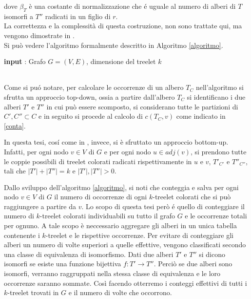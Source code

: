 dove $ \beta_T $ \`e una costante di normalizzazione che \'e uguale al numero di alberi di $ T $ isomorfi a $ T'' $ radicati in un figlio di $ r $.\\
 La correttezza e la complessit\`a di questa costruzione, non sono trattate qui, ma vengono dimostrate in \cite{alon1995color}.\\
 Si pu\`o vedere l'algoritmo formalmente  descritto in Algoritmo \ref{algoritmo}.\mbox{}\\


\begin{algorithm}[H]
	\label{algoritmo}
	\SetAlgoLined
	\caption{Fase di costruzione}
 	\textbf{input} : Grafo $ G =(V,E) $, dimensione del treelet $ k $ \;	
 			
\end{algorithm}\mbox{}\\

Come si pu\'o notare, per calcolare le occorrenze di un albero $ T_C $ nell'algoritmo si sfrutta un approccio top-down, ossia a partire dall'albero $ T_C $ si identificano i due alberi $ T' $ e $ T'' $ in cui pu\`o essere scomposto, si considerano tutte le partizioni di $ C',C'' \subset C $ e in seguito si procede al calcolo di $ c(T_C,v) $ come indicato in \eqref{conta}.

In questa tesi, cos\'i come in \cite{bressan2019motivo}, invece, si \`e sfruttato un approccio bottom-up. Infatti, per ogni nodo $ v \in V $ di $ G $ e per ogni nodo $ u \in adj(v)$, si prendono tutte le coppie possibili di treelet colorati radicati rispettivamente in $ u $ e $ v $, $ T'_{C'} $ e $ T''_{C''} $, tali che $ |T'| + |T''| = k $ e $ |T'|,|T''|>0 $.

Dallo sviluppo dell'algoritmo \ref{algoritmo}, si noti che conteggia e salva per ogni nodo $ v\in V $ di $ G $ il numero di occorrenze di ogni $ k $-treelet colorati che si pu\`o raggiungere a partire da $ v $.
Lo scopo di questa tesi per\`o \'e quello di conteggiare il numero di $ k $-treelet colorati individuabili su tutto il grafo $ G $ e le occorrenze totali per ognuno.
A tale scopo \`e neccessario aggregare gli alberi in un unica tabella contenente i $ k $-treelet e le rispettive occorrenze.
Per evitare di conteggiare gli alberi un numero di volte superiori a quelle effettive, vengono classificati secondo una classe di equivalenza di isomorfismo. Dati due alberi $ T' $ e $ T'' $ si dicono isomorfi se esiste una funzione bijettiva $ f : T' \rightarrow T'' $.
Perci\`o se due alberi sono isomorfi, verranno raggruppati nella stessa classe di equivalenza e le loro occorrenze saranno sommate.
Cos\`i facendo otterremo i conteggi effettivi di tutti i $ k $-treelet trovati in $ G $ e il numero di volte che occorrono. 


